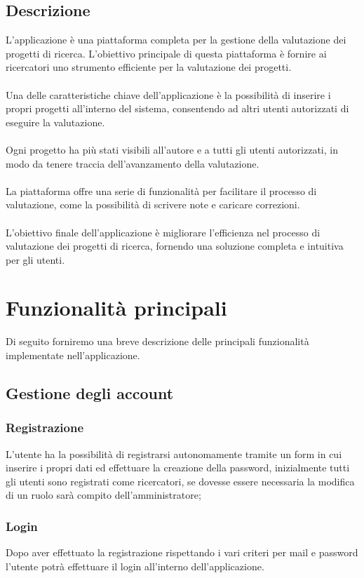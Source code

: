 \documentclass{article}
\begin{document}
\subsection{Descrizione}
L'applicazione è una piattaforma completa per la gestione della valutazione dei progetti di ricerca. L'obiettivo principale di questa piattaforma è fornire ai ricercatori uno strumento efficiente per la valutazione dei progetti.\\\\Una delle caratteristiche chiave dell'applicazione è la possibilità di inserire i propri progetti all'interno del sistema, consentendo ad altri utenti autorizzati di eseguire la valutazione.\\\\Ogni progetto ha più stati visibili all'autore e a tutti gli utenti autorizzati, in modo da tenere traccia dell'avanzamento della valutazione.\\\\La piattaforma offre una serie di funzionalità  per facilitare il processo di valutazione, come la possibilità di scrivere note e caricare correzioni.\\\\L'obiettivo finale dell'applicazione è migliorare l'efficienza nel processo di valutazione dei progetti di ricerca, fornendo una soluzione completa e intuitiva per gli utenti.
\section{Funzionalità principali}
Di seguito forniremo una breve descrizione delle principali funzionalità implementate nell'applicazione. 
\subsection{Gestione degli account}
\subsubsection{Registrazione}
L'utente ha la possibilità di registrarsi autonomamente tramite un form in cui inserire i propri dati ed effettuare la creazione della password, inizialmente tutti gli utenti sono registrati come ricercatori, se dovesse essere necessaria la modifica di un ruolo sarà compito dell'amministratore;

\subsubsection{Login}
Dopo aver effettuato la registrazione rispettando i vari criteri per mail e password l'utente potrà effettuare il login all'interno dell'applicazione. 
\end{document}
